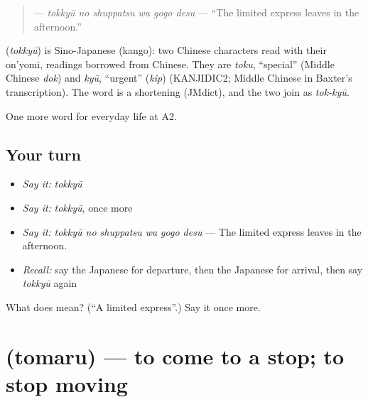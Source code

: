\begin{quote}
\textbf{  } — \emph{tokkyū no shuppatsu wa gogo desu} — \textquotedblleft{}The limited express leaves in the afternoon.\textquotedblright{}
\end{quote}

\begin{cousinweb}
\textbf{} (\emph{tokkyū}) is Sino-Japanese (kango): two Chinese characters read with their on'yomi, readings borrowed from Chinese. They are \emph{toku}, \textquotedblleft{}special\textquotedblright{} (Middle Chinese \emph{dok}) and \emph{kyū}, \textquotedblleft{}urgent\textquotedblright{} (\emph{kip}) (KANJIDIC2; Middle Chinese in Baxter's transcription). The word is a shortening (JMdict), and the two join as \emph{tok-kyū}.
\end{cousinweb}

\begin{grammarlens}[title={What you've built}]
One more word for everyday life at A2.
\end{grammarlens}

\subsection*{Your turn}
\begin{itemize}
\raggedright
  \item \emph{Say it:} \emph{tokkyū}
  \item \emph{Say it:} \emph{tokkyū}, once more
  \item \emph{Say it:} \emph{tokkyū no shuppatsu wa gogo desu} — The limited express leaves in the afternoon.
  \item \emph{Recall:} say the Japanese for departure, then the Japanese for arrival, then say \emph{tokkyū} again
\end{itemize}

\begin{tcolorbox}[breakable,colback=teal!4,colframe=teal!35!black,title={Before you move on}]
What does  mean? (\textquotedblleft{}A limited express\textquotedblright{}.) Say it once more.
\end{tcolorbox}
\section[\texorpdfstring{\ja{とまる} (tomaru)}{とまる (tomaru)}]{ (tomaru) — to come to a stop; to stop moving}

